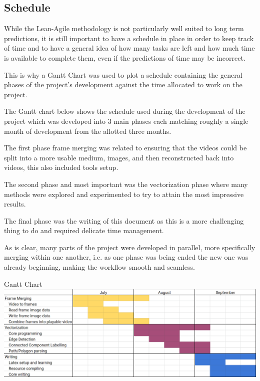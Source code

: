 \documentclass[12pt]{article}
\newcommand{\sentence}{} %
\begin{document}
    \subsection{Schedule}\label{subsec:schedule}

    \tab
    While the Lean-Agile methodology is not particularly well suited to long term predictions, it is still important
    to have a schedule in place in order to keep track of time and to have a general idea of how many tasks are left
    and how much time is available to complete them, even if the predictions of time may be incorrect.
    \sentence
    This is why a Gantt Chart was used to plot a schedule containing the general phases of the project's development
    against the time allocated to work on the project.
    \sentence
    The Gantt chart below shows the schedule used during the development of the project which was developed into 3
    main phases each matching roughly a single month of development from the allotted three months.
    \sentence
    The first phase frame merging was related to ensuring that the videos could be split into a more usable medium,
    images, and then reconstructed back into videos, this also included tools setup.
    \sentence
    The second phase and most important was the vectorization phase where many methods were explored and experimented
    to try to attain the most impressive results.
    \sentence
    The final phase was the writing of this document as this is a more challenging thing to do and required delicate
    time management.
    \sentence
    As is clear, many parts of the project were developed in parallel, more specifically merging within one another,
    i.e. as one phase was being ended the new one was already beginning, making the workflow smooth and seamless.

    \pagebreak
    \thispagestyle{empty}
    \begin{landscape}
        \begin{center}
            \huge{Gantt Chart}
            \vspace{1cm}
            \linebreak
            \normalsize
            \includegraphics[scale=0.53]{Gantt.png}
        \end{center}
    \end{landscape}
    \pagebreak
\end{document}
